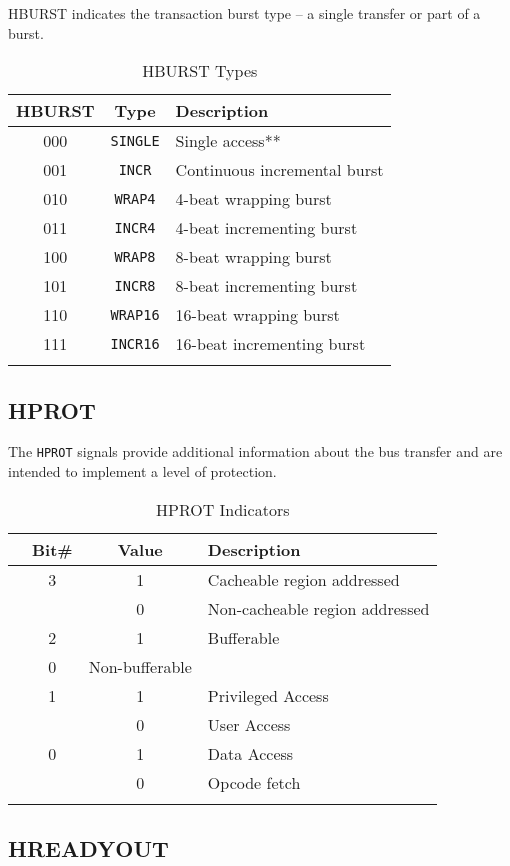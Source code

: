 HBURST indicates the transaction burst type -- a single transfer or part
of a burst.

\begin{longtable}[c]{@{\extracolsep{\fill}}ccl}	
		\toprule 
		\textbf{HBURST} & \textbf{Type} & \textbf{Description}\\
		\midrule
		\endhead 
		000 & \texttt{SINGLE} & Single access**\\
		001 & \texttt{INCR} & Continuous incremental burst\\
		010 & \texttt{WRAP4} & 4-beat wrapping burst\\
		011 & \texttt{INCR4} & 4-beat incrementing burst\\
		100 & \texttt{WRAP8} & 8-beat wrapping burst\\
		101 & \texttt{INCR8} & 8-beat incrementing burst\\
		110 & \texttt{WRAP16} & 16-beat wrapping burst\\
		111 & \texttt{INCR16} & 16-beat incrementing burst\\
		\bottomrule 	
	\caption{HBURST Types}
	\label{tab:HBURST}
\end{longtable}

\subsection{HPROT}

The \texttt{HPROT} signals provide additional information about the bus
transfer and are intended to implement a level of protection.

\begin{longtable}[c]{@{}lccl}	
		\toprule 
		& \textbf{Bit\#} & \textbf{Value} & \textbf{Description}\\
		\midrule
		\endhead 
		& 3 & 1 & Cacheable region addressed\\
		& & 0 & Non-cacheable region addressed\\
		& 2 & 1 & Bufferable\\
		& 0 & Non-bufferable\\
		& 1 & 1 & Privileged Access\\
		& & 0 & User Access\\
		& 0 & 1 & Data Access\\
		& & 0 & Opcode fetch\\
		\bottomrule 	
	\caption{HPROT Indicators}
	\label{tab:HPROT}
\end{longtable}

\subsection{HREADYOUT}

